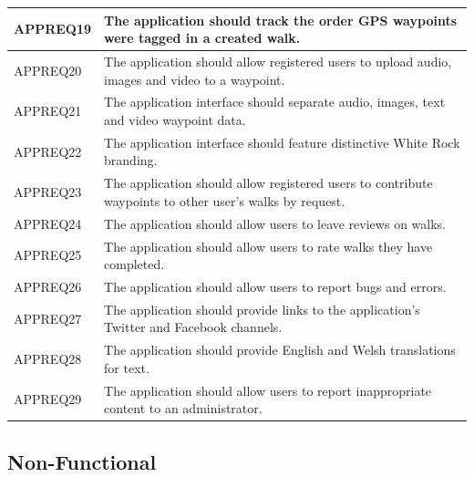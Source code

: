 \documentclass[11pt,a4paper]{article}
\begin{document}
\begin{longtable}{|p{2.5cm}p{13cm}|}
APPREQ19 & The application should track the order GPS waypoints were tagged in a created walk. \\ \hline
APPREQ20 & The application should allow registered users to upload audio, images and video to a waypoint. \\ \hline
APPREQ21 & The application interface should separate audio, images, text and video waypoint data. \\ \hline
APPREQ22 & The application interface should feature distinctive White Rock branding. \\ \hline
APPREQ23 & The application should allow registered users to contribute waypoints to other user's walks by request. \\ \hline
APPREQ24 & The application should allow users to leave reviews on walks. \\ \hline
APPREQ25 & The application should allow users to rate walks they have completed. \\ \hline
APPREQ26 & The application should allow users to report bugs and errors. \\ \hline
APPREQ27 & The application should provide links to the application's Twitter and Facebook channels. \\ \hline
APPREQ28 & The application should provide English and Welsh translations for text. \\ \hline
APPREQ29 & The application should allow users to report inappropriate content to an administrator. \\ \hline
\end{longtable}

\subsection{Non-Functional}
\label{sec:non-func-reqs}
\end{document}
